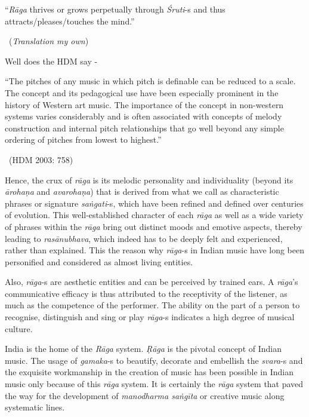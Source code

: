 \begin{myquote}
“\textit{Rāga} thrives or grows perpetually through \textit{Śruti}-s and thus attracts/\break pleases/touches the mind.” 

~\hfill (\textit{Translation my own})
\end{myquote}

Well does the HDM say -

\begin{myquote}
“The pitches of any music in which pitch is definable can be reduced to a scale. The concept and its pedagogical use have been especially prominent in the history of Western art music. The importance of the concept in non-western systems varies considerably and is often associated with concepts of melody construction and internal pitch relationships that go well beyond any simple ordering of pitches from lowest to highest.” 

~\hfill (HDM 2003: 758)
\end{myquote}

Hence, the crux of \textit{rāga} is its melodic personality and individuality (beyond its \textit{ārohaṇa} and \textit{avarohaṇa}) that is derived from what we call as characteristic phrases or signature \textit{saṅgati}-s, which have been refined and defined over centuries of evolution. This well-established character of each \textit{rāga} as well as a wide variety of phrases within the \textit{rāga} bring out distinct moods and emotive aspects, thereby leading to \textit{rasānubhava}, which indeed has to be deeply felt and experienced, rather than explained. This the reason why \textit{rāga}-s in Indian music have long been personified and considered as almost living entities. 

Also, \textit{rāga}-s are aesthetic entities and can be perceived by trained ears. A \textit{rāga}’s communicative efficacy is thus attributed to the receptivity of the listener, as much as the competence of the performer. The ability on the part of a person to recognise, distinguish and sing or play \textit{rāga}-s indicates a high degree of musical culture.

India is the home of the \textit{Rāga} system. \textit{Ṛāga} is the pivotal concept of Indian music. The usage of \textit{gamaka}-s to beautify, decorate and embellish the \textit{svara}-s and the exquisite workmanship in the creation of music has been possible in Indian music only because of this \textit{rāga} system. It is certainly the \textit{rāga} system that paved the way for the development of \textit{manodharma saṅgīta} or creative music along systematic lines.


